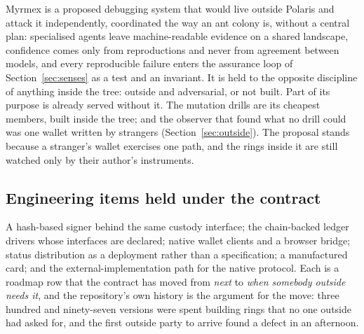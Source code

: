 Myrmex is a proposed debugging system that would live outside Polaris and attack it independently,
coordinated the way an ant colony is, without a central plan: specialised agents leave
machine-readable evidence on a shared landscape, confidence comes only from reproductions and never
from agreement between models, and every reproducible failure enters the assurance loop of
Section~\ref{sec:senses} as a test and an invariant. It is held to the opposite discipline of anything
inside the tree: outside and adversarial, or not built. Part of its purpose is already served without
it. The mutation drills are its cheapest members, built inside the tree; and the observer that found
what no drill could was one wallet written by strangers (Section~\ref{sec:outside}). The proposal
stands because a stranger's wallet exercises one path, and the rings inside it are still watched only
by their author's instruments. \sFut

\subsection{Engineering items held under the contract}

A hash-based signer behind the same custody interface; the chain-backed ledger drivers whose
interfaces are declared; native wallet clients and a browser bridge; status distribution as a
deployment rather than a specification; a manufactured card; and the external-implementation path
for the native protocol. Each is a roadmap row that the contract has moved from \emph{next} to
\emph{when somebody outside needs it}, and the repository's own history is the argument for the
move: three hundred and ninety-seven versions were spent building rings that no one outside had
asked for, and the first outside party to arrive found a defect in an afternoon.
